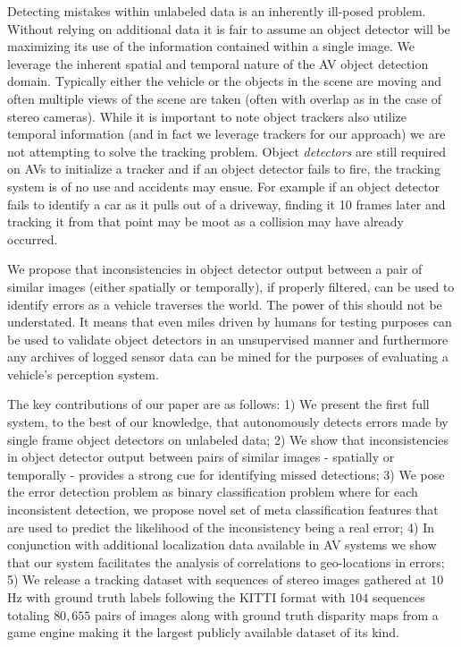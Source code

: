 \documentclass[letterpaper, 10 pt, journal, twoside]{IEEEtran}  %
\begin{document}
Detecting mistakes within unlabeled data is an inherently ill-posed problem. Without relying on additional data it is fair to assume an object detector will be maximizing its use of the information contained within a single image. We leverage the inherent spatial and temporal nature of the AV object detection domain. Typically either the vehicle or the objects in the scene are moving and often multiple views of the scene are taken (often with overlap as in the case of stereo cameras). While it is important to note object trackers also utilize temporal information (and in fact we leverage trackers for our approach) we are not attempting to solve the tracking problem. Object \textit{detectors} are still required on AVs to initialize a tracker and if an object detector fails to fire, the tracking system is of no use and accidents may ensue. For example if an object detector fails to identify a car as it pulls out of a driveway, finding it 10 frames later and tracking it from that point may be moot as a collision may have already occurred.

We propose that inconsistencies in object detector output between a pair of similar
images (either spatially or temporally), if properly filtered, can be used to identify errors as a vehicle traverses the world. The power of this should not be understated. It means that even miles driven by humans for testing purposes can be used to validate object detectors in an unsupervised manner and furthermore any archives of logged sensor data can be mined for the purposes of evaluating a vehicle's perception system.

The key contributions of our paper are as follows: 1) We present the first full system, to the best of our knowledge, that autonomously detects errors made by single frame object detectors on unlabeled data; 2) We show that inconsistencies in object detector output between pairs of similar images - spatially or temporally - provides a strong cue for identifying missed detections; 3) We pose the error detection problem as binary classification problem where for each inconsistent detection, we propose novel set of meta classification features that are used to predict the likelihood of the inconsistency being a real error; 4) In conjunction with additional localization data available in AV systems we show that our system facilitates the analysis of correlations to geo-locations in errors; 5) We release a tracking dataset with sequences of stereo images gathered at $10$ Hz with ground truth labels following the KITTI format with $104$ sequences totaling $80,655$ pairs of images along with ground truth disparity maps from a game engine making it the largest publicly available dataset of its kind. 
\end{document}
